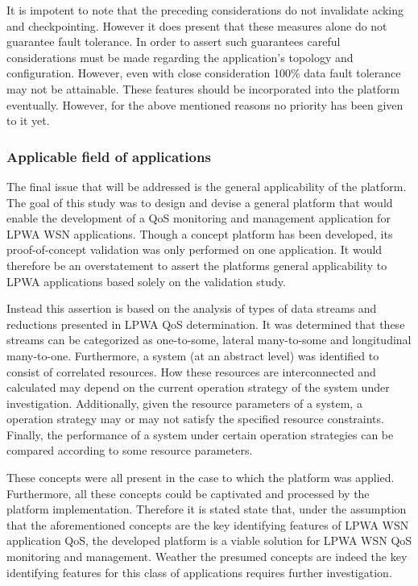 It is impotent to note that the preceding considerations do not invalidate acking and checkpointing. However it does present that these measures alone do not guarantee fault tolerance. In order to assert such guarantees careful considerations must be made regarding the application's topology and configuration. However, even with close consideration 100\% data fault tolerance may not be attainable. These features should be incorporated into the platform eventually. However, for the above mentioned reasons no priority has been given to it yet.

\subsubsection{Applicable field of applications}
The final issue that will be addressed is the general applicability of the platform. The goal of this study was to design and devise a general platform that would enable the development of a QoS monitoring and management application for LPWA WSN applications. Though a concept platform has been developed, its proof-of-concept validation was only performed on one application. It would therefore be an overstatement to assert the platforms general applicability to LPWA applications based solely on the validation study.

Instead this assertion is based on the analysis of types of data streams and reductions presented in LPWA QoS determination. It was determined that these streams can be categorized as one-to-some, lateral many-to-some and longitudinal many-to-one. Furthermore, a system (at an abstract level) was identified to consist of correlated resources. How these resources are interconnected and calculated may depend on the current operation strategy of the system under investigation. Additionally, given the resource parameters of a system, a operation strategy may or may not satisfy the specified resource constraints. Finally, the performance of a system under certain operation strategies can be compared according to some resource parameters.

These concepts were all present in the case to which the platform was applied. Furthermore, all these concepts could be captivated and processed by the platform implementation. Therefore it is stated state that, under the assumption that the aforementioned concepts are the key identifying features of LPWA WSN application QoS, the developed platform is a viable solution for LPWA WSN QoS monitoring and management. Weather the presumed concepts are indeed the key identifying features for this class of applications requires further investigation. 

